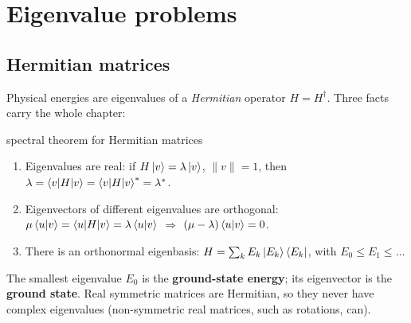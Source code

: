 \documentclass[11pt,a4paper,openany]{book}
\begin{document}
\section{Eigenvalue problems}
\subsection{Hermitian matrices}
Physical energies are eigenvalues of a \emph{Hermitian} operator $H = H^\dagger$. Three facts carry the whole chapter:
\begin{keyres}{spectral theorem for Hermitian matrices}
\begin{enumerate}[itemsep=1pt]
\item Eigenvalues are real: if $H\ket v = \lambda\ket v$, $\|v\| = 1$, then $\lambda = \braket{v|H|v} = \braket{v|H|v}^* = \lambda^*$.
\item Eigenvectors of different eigenvalues are orthogonal: $\mu\braket{u|v} = \braket{u|H|v} = \lambda\braket{u|v}$ $\Rightarrow$ $(\mu - \lambda)\braket{u|v} = 0$.
\item There is an orthonormal eigenbasis: $H = \sum_kE_k\ket{E_k}\bra{E_k}$, with $E_0 \le E_1 \le \dots$
\end{enumerate}
\end{keyres}
The smallest eigenvalue $E_0$ is the \textbf{ground-state energy}; its eigenvector is the \textbf{ground state}. Real symmetric matrices are
Hermitian, so they never have complex eigenvalues (non-symmetric real matrices, such as rotations, can).
\end{document}
